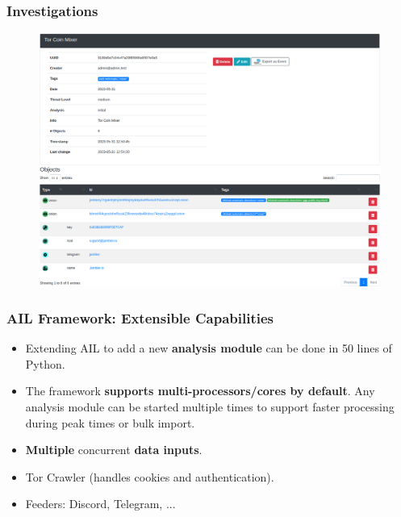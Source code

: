 \documentclass[10pt,aspectratio=169, colorlinks=true, linkcolor=circlBlue]{beamer}
\begin{document}
\begin{frame}
    \frametitle{Investigations}
    \begin{figure}
        \includegraphics[scale=0.22, angle=0]{screenshot/investigation_mixer.png}
    \end{figure}
\end{frame}

\begin{frame}
    \frametitle{AIL Framework: Extensible Capabilities}
    \begin{itemize}
        \item Extending AIL to add a new \textbf{analysis module} can be done in 50 lines of Python.
        \item The framework \textbf{supports multi-processors/cores by default}. Any analysis module can be started multiple times to support faster processing during peak times or bulk import.
        \item \textbf{Multiple} concurrent \textbf{data inputs}.
        \item Tor Crawler (handles cookies and authentication).
        \item Feeders: Discord, Telegram, ...
    \end{itemize}
\end{frame}
\end{document}
